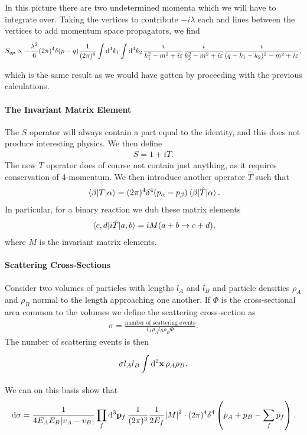 In this picture there are two undetermined momenta which we will have to integrate over. Taking the vertices to contribute $-i\lambda$ each and lines between the vertices to add momentum space propagators, we find
\begin{align*}
	S_{qp} \propto -\frac{\lambda^{2}}{6}(2\pi)^{4}\delta(p - q)\frac{1}{(2\pi)^{8}}\int\limits_{}^{}\dd[4]{k_{1}}\int\limits_{}^{}\dd[4]{k_{2}}\frac{i}{k_{1}^{2} - m^{2} + i\varepsilon}\frac{i}{k_{2}^{2} - m^{2} + i\varepsilon}\frac{i}{(q - k_{1} - k_{2})^{2} - m^{2} + i\varepsilon},
\end{align*}
which is the same result as we would have gotten by proceeding with the previous calculations.

\paragraph{The Invariant Matrix Element}
The $S$ operator will always contain a part equal to the identity, and this does not produce interesting physics. We then define
\begin{align*}
	S = 1 + iT.
\end{align*}
The new $T$ operator does of course not contain just anything, as it requires conservation of 4-momentum. We then introduce another operator $\hat{T}$ such that
\begin{align*}
	\mel{\beta}{T}{\alpha} = (2\pi)^{4}\delta^{4}(p_{\alpha} - p_{\beta})\mel{\beta}{\hat{T}}{\alpha}.
\end{align*}
In particular, for a binary reaction we dub these matrix elements
\begin{align*}
	\mel{c, d}{i\hat{T}}{a, b} = iM(a + b\to c + d),
\end{align*}
where $M$ is the invariant matrix elements.

\paragraph{Scattering Cross-Sections}
Consider two volumes of particles with lengths $l_{A}$ and $l_{B}$ and particle densities $\rho_{A}$ and $\rho_{B}$ normal to the length approaching one another. If $\Phi$ is the cross-sectional area common to the volumes we define the scattering cross-section as
\begin{align*}
	\sigma = \frac{\text{number of scattering events}}{l_{A}\rho_{A}l_{B}\rho_{B}\Phi}.
\end{align*}
The number of scattering events is then
\begin{align*}
	\sigma l_{A}l_{B}\int\limits_{}^{}\dd[2]{\vb{x}}\rho_{A}\rho_{B}.
\end{align*}
We can on this basis show that
\begin{align*}
	\dd{\sigma} = \frac{1}{4E_{A}E_{B}\abs{v_{A} - v_{B}}}\prod\limits_{f}\dd[3]{\vb{p}_{f}}\frac{1}{(2\pi)^{3}}\frac{1}{2E_{f}}\abs{M}^{2}\cdot (2\pi)^{4}\delta^{4}\left(p_{A} + p_{B} - \sum\limits_{f}p_{f}\right).
\end{align*}

